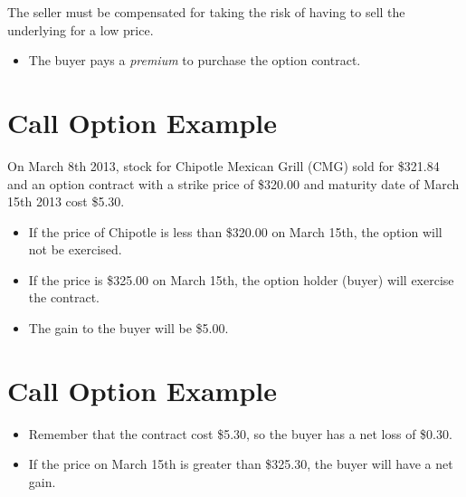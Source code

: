 \documentclass[letterpaper,10pt,english]{sphinxmanual}
\begin{document}
The seller must be compensated for taking the risk of having to sell
the underlying for a low price.
\begin{itemize}
\item {} 
The buyer pays a \emph{premium} to purchase the option contract.

\end{itemize}


\section{Call Option Example}
\label{options:call-option-example}
On March 8th 2013, stock for Chipotle Mexican Grill (CMG) sold for
\$321.84 and an option contract with a strike price of \$320.00 and
maturity date of March 15th 2013 cost \$5.30.
\begin{itemize}
\item {} 
If the price of Chipotle is less than \$320.00 on March 15th, the
option will not be exercised.

\end{itemize}
\begin{itemize}
\item {} 
If the price is \$325.00 on March 15th, the option holder (buyer)
will exercise the contract.

\end{itemize}
\begin{itemize}
\item {} 
The gain to the buyer will be \$5.00.

\end{itemize}


\section{Call Option Example}
\label{options:id4}\begin{itemize}
\item {} 
Remember that the contract cost \$5.30, so the buyer has a net loss
of \$0.30.

\end{itemize}
\begin{itemize}
\item {} 
If the price on March 15th is greater than \$325.30, the buyer will
have a net gain.

\end{itemize}
\end{document}
